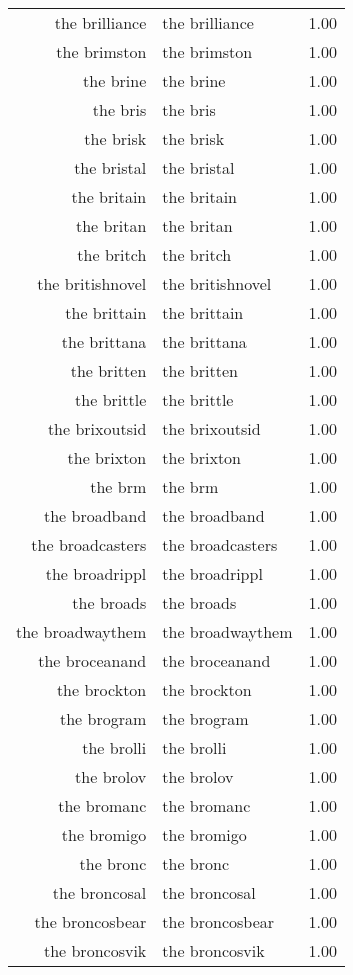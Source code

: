 \begin{table}[ht]
\begin{tabular}{rlr}
  the brilliance & the brilliance & 1.00 \\ 
  the brimston & the brimston & 1.00 \\ 
  the brine & the brine & 1.00 \\ 
  the bris & the bris & 1.00 \\ 
  the brisk & the brisk & 1.00 \\ 
  the bristal & the bristal & 1.00 \\ 
  the britain & the britain & 1.00 \\ 
  the britan & the britan & 1.00 \\ 
  the britch & the britch & 1.00 \\ 
  the britishnovel & the britishnovel & 1.00 \\ 
  the brittain & the brittain & 1.00 \\ 
  the brittana & the brittana & 1.00 \\ 
  the britten & the britten & 1.00 \\ 
  the brittle & the brittle & 1.00 \\ 
  the brixoutsid & the brixoutsid & 1.00 \\ 
  the brixton & the brixton & 1.00 \\ 
  the brm & the brm & 1.00 \\ 
  the broadband & the broadband & 1.00 \\ 
  the broadcasters & the broadcasters & 1.00 \\ 
  the broadrippl & the broadrippl & 1.00 \\ 
  the broads & the broads & 1.00 \\ 
  the broadwaythem & the broadwaythem & 1.00 \\ 
  the broceanand & the broceanand & 1.00 \\ 
  the brockton & the brockton & 1.00 \\ 
  the brogram & the brogram & 1.00 \\ 
  the brolli & the brolli & 1.00 \\ 
  the brolov & the brolov & 1.00 \\ 
  the bromanc & the bromanc & 1.00 \\ 
  the bromigo & the bromigo & 1.00 \\ 
  the bronc & the bronc & 1.00 \\ 
  the broncosal & the broncosal & 1.00 \\ 
  the broncosbear & the broncosbear & 1.00 \\ 
  the broncosvik & the broncosvik & 1.00 \\ 

\end{tabular}
\end{table}
